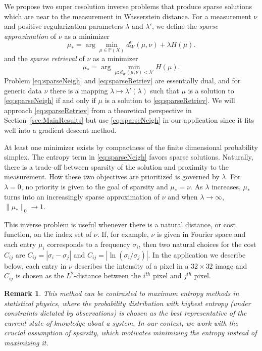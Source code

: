 \documentclass[conference]{IEEEtran}
\newcommand{\bbP}{{\mathbb{P}}}
\newtheorem*{remark}{Remark}
\begin{document}
We propose two super resolution inverse problems that produce sparse solutions which are near to the measurement in Wasserstein distance. For a measurement $\nu$ and positive regularization parameters $\lambda$ and $\lambda'$, we define the \emph{sparse approximation} of $\nu$ as a minimizer 
\begin{equation}
    \mu_* = \arg\min_{\mu \in \bbP(X)} d_W^\epsilon(\mu,\nu) + \lambda H(\mu).
    \label{eq:sparseNeigh}
\end{equation}
and the \emph{sparse retrieval} of $\nu$ as a minimizer 
\begin{equation}
    \mu_* = \arg\min_{\mu: d_W(\mu,\nu)<\lambda'} H(\mu).
    \label{eq:sparseRetriev}
\end{equation}
Problem \eqref{eq:sparseNeigh} and \eqref{eq:sparseRetriev} are essentially dual, and for generic data $\nu$ there is a mapping $\lambda \mapsto \lambda'(\lambda)$ such that $\mu$ is a solution to \eqref{eq:sparseNeigh} if and only if $\mu$ is a solution to \eqref{eq:sparseRetriev}. We will approach \eqref{eq:sparseRetriev} from a theoretical perspective in Section~\ref{sec:MainResults} but use \eqref{eq:sparseNeigh} in our application since it fits well into a gradient descent method. 

At least one minimizer exists by compactness of the finite dimensional probability simplex. The entropy term in \eqref{eq:sparseNeigh} favors sparse solutions. Naturally, there is a trade-off between sparsity of the solution and proximity to the measurement. How these two objectives are prioritized is governed by $\lambda$. For $\lambda=0$, no priority is given to the goal of sparsity and $\mu_* = \nu$. As $\lambda$ increases, $\mu_*$ turns into an increasingly sparse approximation of $\nu$ and when $\lambda \rightarrow \infty$, $\|\mu_*\|_0 \rightarrow 1$.  

This inverse problem is useful whenever there is a natural distance, or cost function, on the index set of $\nu$. If, for example, $\nu$ is given in Fourier space and each entry $\mu_i$ corresponds to a frequency $\sigma_i$, then two natural choices for the cost $C_{ij}$ are $C_{ij} = |\sigma_i-\sigma_j|$ and $C_{ij} = |\ln(\sigma_i/\sigma_j)|$. In the application we describe below, each entry in $\nu$ describes the intensity of a pixel in a $32\times 32$ image and $C_{ij}$ is chosen as the $L^2$-distance between the $i^{th}$ pixel and $j^{th}$ pixel.

\begin{remark}
This method can be contrasted to maximum entropy methods in statistical physics, where the probability distribution with highest entropy (under constraints dictated by observations) is chosen as the best representative of the current state of knowledge about a system. In our context, we work with the crucial assumption of sparsity, which motivates minimizing the entropy instead of maximizing it. 
\end{remark}
\end{document}
